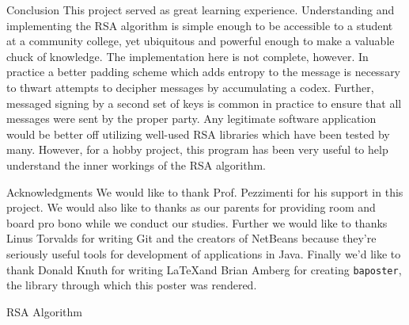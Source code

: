 \documentclass[landscape,a0paper,fontscale=.46]{baposter} %
\begin{document}
\begin{poster}

\begin{posterbox}[name=conclusion, column=2, below=code]{Conclusion} 
This project served as great learning experience. Understanding and implementing the RSA algorithm is simple enough to be accessible to a student at a community college, yet ubiquitous and powerful enough to make a valuable chuck of knowledge. The implementation here is not complete, however. In practice a better padding scheme which adds entropy to the message is necessary to thwart attempts to decipher messages by accumulating a codex. Further, messaged signing by a second set of keys is common in practice to ensure that all messages were sent by the proper party. Any legitimate software application would be better off utilizing well-used RSA libraries which have been tested by many. However, for a hobby project, this program has been very useful to help understand the inner workings of the RSA algorithm.
\end{posterbox}


\begin{posterbox}[name=conclusion, column=3, below=code]{Acknowledgments} 
We would like to thank Prof. Pezzimenti for his support in this project. We would also like to thanks as our parents for providing room and board pro bono while we conduct our studies. Further we would like to thanks Linus Torvalds for writing Git and the creators of NetBeans because they're seriously useful tools for development of applications in Java. Finally we'd like to thank Donald Knuth for writing \LaTeX and Brian Amberg for creating \verb|baposter|, the library through which this poster was rendered.
\end{posterbox}



\begin{posterbox}[name=rsa,column=1,row=0]{RSA Algorithm} %


\end{posterbox}
\end{poster}
\end{document}
